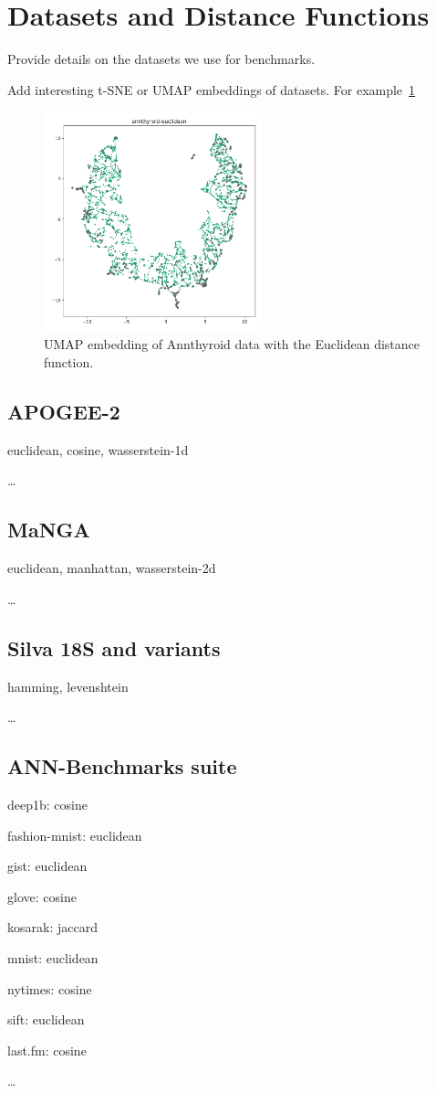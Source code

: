 \section{Datasets and Distance Functions}
\label{sec:datasets-and-distance-functions}

Provide details on the datasets we use for benchmarks.

Add interesting t-SNE or UMAP embeddings of datasets.
For example~\ref{fig:discussion:umap-annthyroid-euclidean}

\begin{figure}[ht!]
    \centering
    \includegraphics[width=2.5in]{images/umaps/annthyroid-euclidean-umap2d.png}
    \caption{UMAP embedding of Annthyroid data with the Euclidean distance function.}
    \label{fig:discussion:umap-annthyroid-euclidean}
\end{figure}

\subsection{APOGEE-2}
\label{subsec:datasets:apogee-2}

euclidean, cosine, wasserstein-1d

\dots

\subsection{MaNGA}
\label{subsec:datasets:manga}

euclidean, manhattan, wasserstein-2d

\dots

\subsection{Silva 18S and variants}
\label{subsec:datasets:silva-18s}

hamming, levenshtein

\dots

\subsection{ANN-Benchmarks suite}
\label{subsec:datasets:ann-benchmarks-suite}

deep1b: cosine

fashion-mnist: euclidean

gist: euclidean

glove: cosine

kosarak: jaccard

mnist: euclidean

nytimes: cosine

sift: euclidean

last.fm: cosine

\dots
